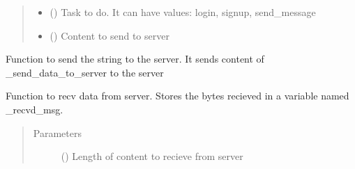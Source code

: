 \documentclass[letterpaper,10pt,english]{sphinxmanual}
\begin{document}
\begin{fulllineitems}
\begin{quote}
\begin{description}
\begin{itemize}
\item {} 
 () \textendash{} Task to do. It can have values: login, signup, send\_message

\item {} 
 () \textendash{} Content to send to server

\end{itemize}

\end{description}\end{quote}

\begin{fulllineitems}
\label{\detokenize{Message:Message.Message._send_data_to_server}}
Function to send the string to the server. It sends content of \_send\_data\_to\_server to the server

\end{fulllineitems}


\begin{fulllineitems}
\label{\detokenize{Message:Message.Message._recv_data_from_server}}
Function to recv data from server. Stores the bytes recieved in a variable named \_recvd\_msg.
\begin{quote}\begin{description}
\item[{Parameters}] \leavevmode
{} () \textendash{} Length of content to recieve from server

\end{description}\end{quote}

\end{fulllineitems}



\end{fulllineitems}
\end{document}
